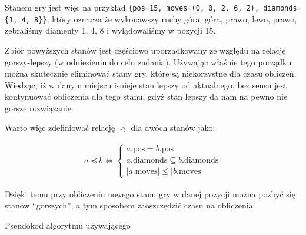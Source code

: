 Stanem gry jest więc na przykład
\texttt{\{pos=15, moves=(0, 0, 2, 6, 2), diamonds=\{1, 4, 8\}\}},
który oznacza że wykonawszy ruchy góra, góra, prawo, lewo, prawo, zebraliśmy
diamenty 1, 4, 8 i wylądowaliśmy w pozycji\footnotemark{} 15.

Zbiór powyższych stanów jest częściowo uporządkowany ze względu na relację
gorszy-lepszy (w odniesieniu do celu zadania).
Używając właśnie tego porządku można skutecznie eliminować stany gry, które
są niekorzystne dla czasu obliczeń.
Wiedząc, iż w danym miejscu isnieje stan lepszy od aktualnego,
bez sensu jest kontynuować obliczenia dla tego stanu, gdyż stan lepszy
da nam na pewno nie gorsze rozwiązanie.

Warto więc zdefiniować relację $\preccurlyeq$ dla dwóch stanów jako:

\begin{gather*}
a \preccurlyeq b
\iff
\begin{cases}
    a.\text{pos} = b.\text{pos} \\
    a.\text{diamonds} \subseteq b.\text{diamonds} \\
    |a.\text{moves}| \leq |b.\text{moves}|
\end{cases}
\end{gather*}

Dzięki temu przy obliczeniu nowego stanu gry w danej pozycji można pozbyć się
stanów ``gorszych'', a tym sposobem zaoszczędzić czasu na obliczenia.







Pseudokod algorytmu używającego



